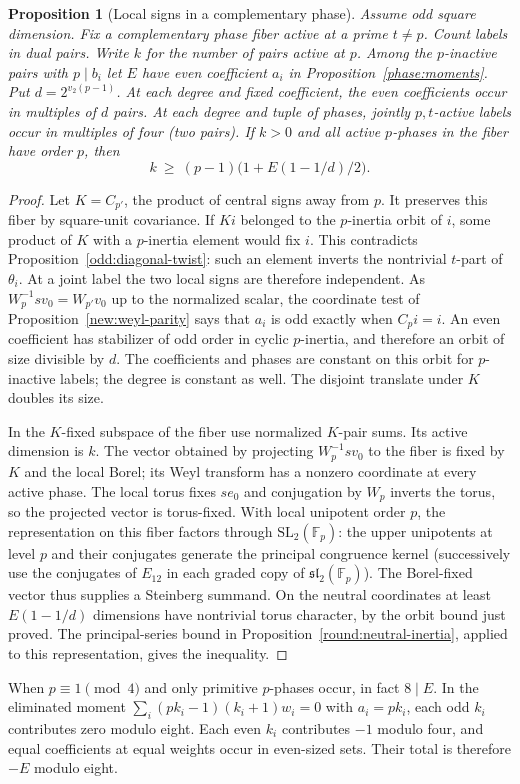 \documentclass[11pt]{amsart}
\numberwithin{equation}{section}
\newtheorem{proposition}[theorem]{Proposition}
\theoremstyle{definition}
\theoremstyle{plain}
\begin{document}
\begin{proposition}[Local signs in a complementary phase]\label{new:sign-fiber}
Assume odd square dimension. Fix a complementary phase fiber active at a prime $t\ne p$.
Count labels in dual pairs. Write $k$ for the number of pairs active
at $p$. Among the $p$-inactive pairs with $p\mid b_i$ let $E$ have
even coefficient $a_i$ in Proposition~\ref{phase:moments}. Put
$d=2^{v_2(p-1)}$. At each degree and fixed coefficient, the even
coefficients occur in multiples of $d$ pairs. At each degree and
tuple of phases, jointly $p,t$-active labels occur in multiples of
four (two pairs). If $k>0$ and all active $p$-phases in the fiber have
order $p$, then
\[
             k\ \ge\ (p-1)\bigl(1+E(1-1/d)/2\bigr).
\]
\end{proposition}
\begin{proof}
Let $K=C_{p'}$, the product of central signs away from $p$. It preserves this fiber by square-unit covariance. If $Ki$ belonged to the $p$-inertia orbit of $i$, some product of $K$ with a $p$-inertia element would fix $i$. This contradicts Proposition~\ref{odd:diagonal-twist}: such an element inverts the nontrivial $t$-part of $\theta_i$. At a joint label the two local signs are therefore independent.
As $W_p^{-1}sv_0=W_{p'}v_0$ up to the normalized scalar, the
coordinate test of Proposition~\ref{new:weyl-parity} says that $a_i$ is odd exactly when $C_pi=i$.
An even coefficient has stabilizer of odd order in cyclic
$p$-inertia, and therefore an orbit of size divisible by $d$.
The coefficients and phases are constant on this orbit for
$p$-inactive labels; the degree is constant as well. The disjoint
translate under $K$ doubles its size.

In the $K$-fixed subspace of the fiber use normalized $K$-pair sums.
Its active dimension is $k$. The vector obtained by projecting
$W_p^{-1}sv_0$ to the fiber is fixed by $K$ and the local Borel;
its Weyl transform has a nonzero coordinate at every active phase. The local torus fixes $se_0$ and conjugation by $W_p$ inverts the torus, so the projected vector is torus-fixed.
With local unipotent order $p$, the representation on this fiber
factors through $\mathrm{SL}_2(\mathbb F_p)$: the upper unipotents
at level $p$ and their conjugates generate the principal congruence
kernel (successively use the conjugates of $E_{12}$ in each graded
copy of $\mathfrak{sl}_2(\mathbb F_p)$). The Borel-fixed vector thus
supplies a Steinberg summand. On the neutral coordinates at least
$E(1-1/d)$ dimensions have nontrivial torus character, by the
orbit bound just proved. The principal-series bound in
Proposition~\ref{round:neutral-inertia}, applied to this representation,
gives the inequality.
\end{proof}
When $p\equiv1\pmod4$ and only primitive $p$-phases occur, in fact
$8\mid E$. In the eliminated moment
$\sum_i(pk_i-1)(k_i+1)w_i=0$ with $a_i=pk_i$, each odd $k_i$
contributes zero modulo eight. Each even $k_i$ contributes $-1$
modulo four, and equal coefficients at equal weights occur in
even-sized sets. Their total is therefore $-E$ modulo eight.
\end{document}
